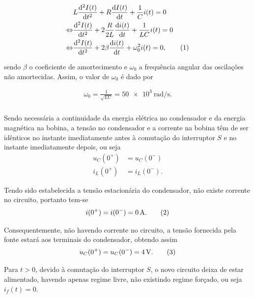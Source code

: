 \documentclass[a4paper, titlepage, portuguese]{article}
\newcommand{\eq}{\Leftrightarrow} %
\newcommand\numberthis{\addtocounter{equation}{1}\tag{\theequation}}
\begin{document}
		\begin{align*}
			&L \dv[2]{I(t)}{t} + R\dv{I(t)}{t} + \frac{1}{C}i(t) = 0 \\ \eq
			&\dv[2]{I(t)}{t} + 2\frac{R}{2L}\dv{i(t)}{t} + \frac{1}{LC}i(t) = 0 \\ \eq
			&\dv[2]{I(t)}{t} + 2\beta \dv{i(t)}{t} + \omega_{0}^{2} i(t) = 0, \numberthis \label{eq_dif_2ordem}
		\end{align*}

		sendo $\beta$ o coeficiente de amortecimento e $\omega_{0}$ a frequência angular das oscilações não amortecidas. Assim, o valor de $\omega_{0}$ é dado por

		\begin{align*}
			\omega_{0} = \frac{1}{\sqrt{LC}} = \SI{50e3}{\radian\per\second}.
		\end{align*}

	\subsubsection{}

		\par
		Sendo necessária a continuidade da energia elétrica no condensador e da energia magnética na bobina, a tensão no condensador e a corrente na bobina têm de ser idênticos no instante imediatamente antes à comutação do interruptor $S$ e no instante imediatamente depois, ou seja
		\begin{align*}
			u_{C}(0^{+}) &= u_{C}(0^{-})\\
			  i_{L}(0^{+}) &= i_{L}(0^{-}).
		\end{align*}

		Tendo sido estabelecida a tensão estacionária do condensador, não existe corrente no circuito, portanto tem-se
		\begin{align*}
			i(0^{+}) = i(0^{-}) = \SI{0}{\ampere}. \numberthis \label{cond_inicial_corrente}
		\end{align*}

		Consequentemente, não havendo corrente no circuito, a tensão fornecida pela fonte estará aos terminais do condensador, obtendo assim
		\begin{align*}
			u_{C}(0^{+}) = u_{C}(0^{-}) = \SI{4}{\volt}. \numberthis \label{cond_inicial_tensão}
		\end{align*}

		Para $t > 0$, devido à comutação do interruptor $S$, o novo circuito deixa de estar alimentado, havendo apenas regime livre, não existindo regime forçado, ou seja $i_f(t) = 0$.
\end{document}
